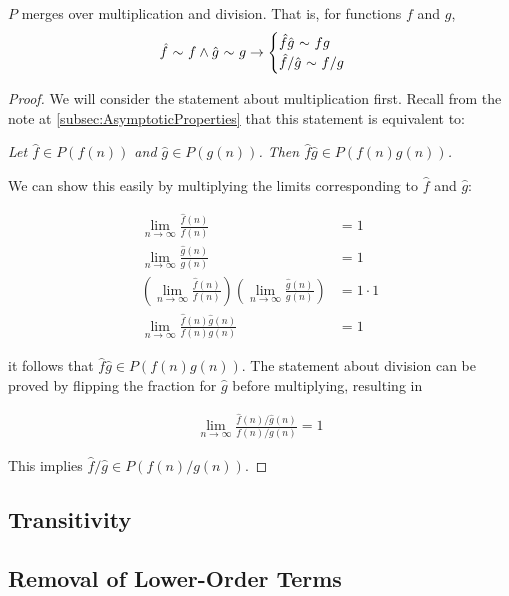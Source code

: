 \begin{theorem}
	$P$ merges over multiplication and division. That is, for functions $f$ and $g$,
	\begin{align*}
	\hat{f} \ \mathtt{\sim}\  f \land \hat{g} \ \mathtt{\sim}\  g \rightarrow \begin{cases}
	\hat{f}\hat{g} \ \mathtt{\sim}\  fg\\
	\hat{f} / \hat{g} \ \mathtt{\sim}\  f / g
	\end{cases}
	\end{align*}
\end{theorem}

\begin{proof}
	We will consider the statement about multiplication first. Recall from the note at \ref{subsec:AsymptoticProperties} that this statement is equivalent to:
	
	\textit{Let $\hat{f} \in P(f(n))$ and $\hat{g} \in P(g(n))$. Then $\hat{f}\hat{g} \in P(f(n)g(n))$.}
	
	We can show this easily by multiplying the limits corresponding to $\hat{f}$ and $\hat{g}$:
	
	\begin{align*}
	\lim_{n \to \infty} \frac{\hat{f}(n)}{f(n)} &= 1\\
	\lim_{n \to \infty} \frac{\hat{g}(n)}{g(n)} &= 1\\
	\left( \lim_{n \to \infty} \frac{\hat{f}(n)}{f(n)} \right) \left( \lim_{n \to \infty} \frac{\hat{g}(n)}{g(n)} \right) &= 1 \cdot 1\\
	\lim_{n \to \infty} \frac{\hat{f}(n)\hat{g}(n)}{f(n)g(n)} &= 1
	\end{align*}
	
	it follows that $\hat{f}\hat{g} \in P(f(n)g(n))$. The statement about division can be proved by flipping the fraction for $\hat{g}$ before multiplying, resulting in
	
	\begin{align*}
	\lim_{n \to \infty} \frac{\hat{f}(n) / \hat{g}(n)}{f(n) / g(n)} = 1
	\end{align*}
	
	This implies $\hat{f} / \hat{g} \in P(f(n) / g(n))$.
\end{proof}

\subsection{Transitivity}
\label{pf:Transitivity}



\subsection{Removal of Lower-Order Terms}
\label{pf:RemovesLowerOrderTerms}

